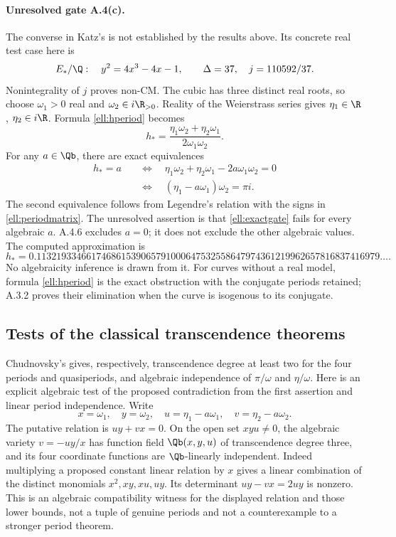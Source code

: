 \paragraph{Unresolved gate A.4(c).}
The converse in Katz's \cite[Question 4.0.8, p.501]{EllKatz1976} is not established by the results above. Its concrete real test case here is
\[
 E_* /\Q:\quad y^2=4x^3-4x-1,
 \qquad \Delta=37,\quad j=110592/37.
\]
Nonintegrality of $j$ proves non-CM. The cubic has three distinct real roots, so choose $\omega_1>0$ real and $\omega_2\in i\R_{>0}$. Reality of the Weierstrass series gives $\eta_1\in\R$, $\eta_2\in i\R$. Formula \eqref{ell:hperiod} becomes
\[
 h_* =\frac{\eta_1\omega_2+\eta_2\omega_1}{2\omega_1\omega_2}.
\]
For any $a\in\Qb$, there are exact equivalences
\begin{equation}\label{ell:exactgate}
 \begin{split}
 h_*=a
 &\quad\Longleftrightarrow\quad
 \eta_1\omega_2+\eta_2\omega_1-2a\omega_1\omega_2=0\\
 &\quad\Longleftrightarrow\quad (\eta_1-a\omega_1)\omega_2=\pi i.
 \end{split}
\end{equation}
The second equivalence follows from Legendre's relation with the signs in \eqref{ell:periodmatrix}. The unresolved assertion is that \eqref{ell:exactgate} fails for every algebraic $a$. A.4.6 excludes $a=0$; it does not exclude the other algebraic values. The computed approximation is
\[
 h_*=0.113219334661746861539065791000647532558647974361219962657816837416979\ldots.
\]
No algebraicity inference is drawn from it. For curves without a real model, formula \eqref{ell:hperiod} is the exact obstruction with the conjugate periods retained; A.3.2 proves their elimination when the curve is isogenous to its conjugate.

\subsection{Tests of the classical transcendence theorems}

Chudnovsky's \cite[\S2A, Theorems 1 and 3, p.343]{EllChudnovsky1978} gives, respectively, transcendence degree at least two for the four periods and quasiperiods, and algebraic independence of $\pi/\omega$ and $\eta/\omega$. Here is an explicit algebraic test of the proposed contradiction from the first assertion and linear period independence. Write
\[
 x=\omega_1,\quad y=\omega_2,\quad
 u=\eta_1-a\omega_1,\quad v=\eta_2-a\omega_2.
\]
The putative relation is $uy+vx=0$. On the open set $xyu\ne0$, the algebraic variety $v=-uy/x$ has function field $\Qb(x,y,u)$ of transcendence degree three, and its four coordinate functions are $\Qb$-linearly independent. Indeed multiplying a proposed constant linear relation by $x$ gives a linear combination of the distinct monomials $x^2,xy,xu,uy$. Its determinant $uy-vx=2uy$ is nonzero. This is an algebraic compatibility witness for the displayed relation and those lower bounds, not a tuple of genuine periods and not a counterexample to a stronger period theorem.

